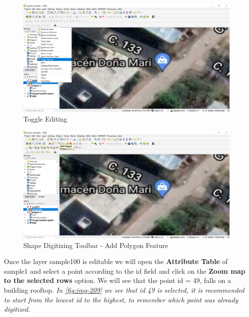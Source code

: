 \documentclass[
]{book}
\begin{document}
\begin{figure}

{\centering \includegraphics[width=1\linewidth]{images/toggle} 

}

\caption{Toggle Editing}\label{fig:img-207}
\end{figure}
\begin{figure}

{\centering \includegraphics[width=1\linewidth]{images/toggle2} 

}

\caption{Shape Digitizing Toolbar - Add Polygon Feature}\label{fig:img-208}
\end{figure}

Once the layer {sample100} is editable we will open the \textbf{Attribute Table} of {sample1} and select a point according to the id field and click on the \textbf{Zoom map to the selected rows} option.
We will see that the point id = 49, falls on a building rooftop.
\emph{In \ref{fig:img-209} we see that id 49 is selected, it is recommended to start from the lowest id to the highest, to remember which point was already digitized.}
\end{document}

